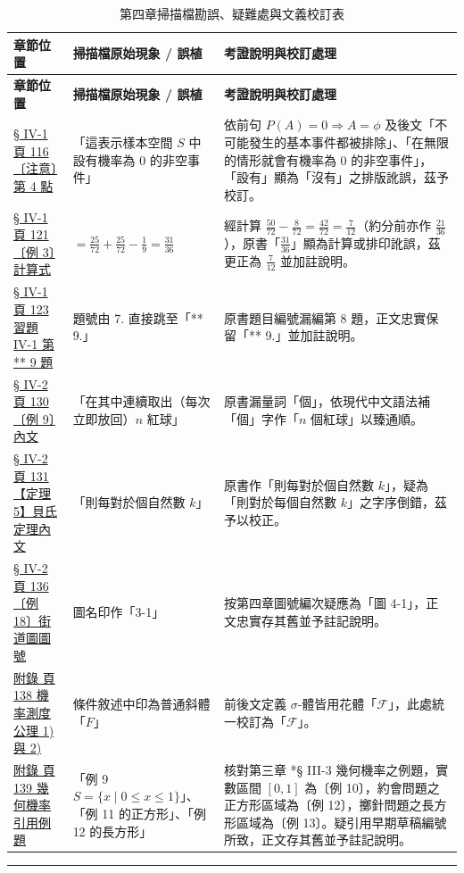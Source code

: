 \documentclass[a4paper,12pt,twoside]{article}
\begin{document}
\small
\renewcommand{\arraystretch}{1.35}
\begin{xltabular}{\textwidth}{|p{3.2cm}|p{3.8cm}|X|}
\caption{第四章掃描檔勘誤、疑難處與文義校訂表}\label{tab:errata_b5_ch4} \\
\hline
\textbf{章節位置} & \textbf{掃描檔原始現象 / 誤植} & \textbf{考證說明與校訂處理} \\ \hline
\endfirsthead
\hline
\textbf{章節位置} & \textbf{掃描檔原始現象 / 誤植} & \textbf{考證說明與校訂處理} \\ \hline
\endhead
\hline
\endfoot

\hyperref[note:b5-ch4-p116-meiyou]{§ IV-1 頁 116 〔注意〕第 4 點} & 
「這表示樣本空間 $S$ 中設有機率為 0 的非空事件」 & 
依前句 $P(A) = 0 \Longrightarrow A = \phi$ 及後文「不可能發生的基本事件都被排除」、「在無限的情形就會有機率為 0 的非空事件」，「設有」顯為「沒有」之排版訛誤，茲予校訂。 \\ \hline

\hyperref[note:b5-ch4-p121-calc]{§ IV-1 頁 121 〔例 3〕計算式} & 
$= \frac{25}{72} + \frac{25}{72} - \frac{1}{9} = \frac{31}{36}$ & 
經計算 $\frac{50}{72} - \frac{8}{72} = \frac{42}{72} = \frac{7}{12}$（約分前亦作 $\frac{21}{36}$），原書「$\frac{31}{36}$」顯為計算或排印訛誤，茲更正為 $\frac{7}{12}$ 並加註說明。 \\ \hline

\hyperref[note:b5-ch4-p123-q8]{§ IV-1 頁 123 習題 IV-1 第 ** 9 題} & 
題號由 7. 直接跳至「** 9.」 & 
原書題目編號漏編第 8 題，正文忠實保留「** 9.」並加註說明。 \\ \hline

\hyperref[note:b5-ch4-ex9-ge]{§ IV-2 頁 130 〔例 9〕內文} & 
「在其中連續取出（每次立即放回）$n$ 紅球」 & 
原書漏量詞「個」，依現代中文語法補「個」字作「$n$ 個紅球」以臻通順。 \\ \hline

\hyperref[note:b5-ch4-bayes-typo]{§ IV-2 頁 131 【定理 5】貝氏定理內文} & 
「則每對於個自然數 $k$」 & 
原書作「則每對於個自然數 $k$」，疑為「則對於每個自然數 $k$」之字序倒錯，茲予以校正。 \\ \hline

\hyperref[note:b5-ch4-p136-fig-num]{§ IV-2 頁 136 〔例 18〕街道圖圖號} & 
圖名印作「3-1」 & 
按第四章圖號編次疑應為「圖 4-1」，正文忠實存其舊並予註記說明。 \\ \hline

\hyperref[note:b5-ch4-p138-f-font]{附錄 頁 138 機率測度公理 1) 與 2)} & 
條件敘述中印為普通斜體「$F$」 & 
前後文定義 $\sigma$-體皆用花體「$\mathscr{F}$」，此處統一校訂為「$\mathscr{F}$」。 \\ \hline

\hyperref[note:b5-ch4-p139-geom-ex-num]{附錄 頁 139 幾何機率引用例題} & 
「例 9 $S=\{x \mid 0 \le x \le 1\}$」、「例 11 的正方形」、「例 12 的長方形」 & 
核對第三章 *§ III-3 幾何機率之例題，實數區間 $[0,1]$ 為〔例 10〕，約會問題之正方形區域為〔例 12〕，擲針問題之長方形區域為〔例 13〕。疑引用早期草稿編號所致，正文存其舊並予註記說明。 \\ \hline

\end{xltabular}

\vspace{1em}
\hrule
\vspace{1em}

\tableofcontents
\newpage


\end{document}
